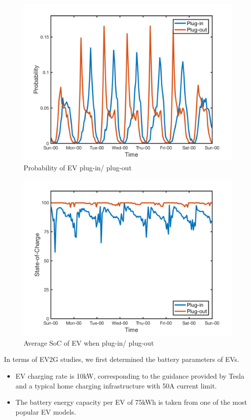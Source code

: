 \begin{figure}[h!]
	\centering
	\centering
	\includegraphics[width=0.8\linewidth]{Figures/Data_EV_number}
	\caption{Probability of EV plug-in/ plug-out}
	\label{fig:data-ev-number}
\end{figure}

\begin{figure}[h!]
	\centering
	\includegraphics[width=0.8\linewidth]{Figures/Data_SoC}
	\caption{Average SoC of EV when plug-in/ plug-out}
	\label{fig:data-soc}
\end{figure}

In terms of EV2G studies, we first determined the battery parameters of EVs.

\begin{itemize}
	\item EV charging rate is 10kW, corresponding to the guidance provided by Tesla\cite{Tesla2} and a typical home charging infrastructure with 50A current limit. 
	\item The battery energy capacity per EV of 75kWh is taken from one of the most popular EV models\cite{Tesla3}.
\end{itemize}

